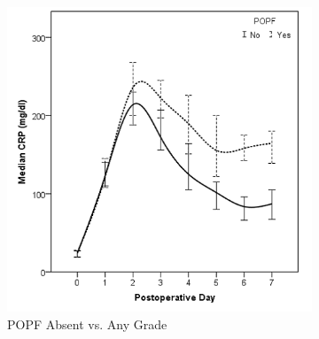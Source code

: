 
\clearpage
\begin{figure}[t]
	\caption{Serum CRP levels in the first week after pancreaticoduodenectomy in patients with postoperative pancreatic fistula (POPF).}
	\label{fig:crp_comp_crp_popf}
	\centering
	\begin{subfigure}{0.48\textwidth}
		\centering
		\includegraphics[width=\textwidth]{Figures/crp_comp_crp_popf_yes_no}
		\caption{POPF Absent vs. Any Grade}
		\label{fig:crp_comp_crp_popf_yes_no}
	\end{subfigure}
	\hfill
	\begin{subfigure}{0.48\textwidth}
		\centering

\end{subfigure}
\end{figure}
